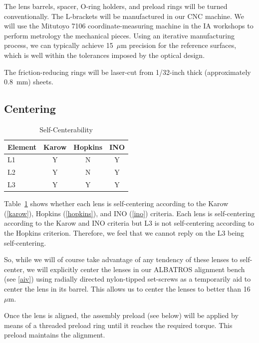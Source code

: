 \documentclass{article}
\newcommand{\micron}{\mbox{$\mu$m}}
\begin{document}
The lens barrels, spacer, O-ring holders, and preload rings will be turned conventionally. The L-brackets will be manufactured in our CNC machine. We will use the Mitutoyo 7106 coordinate-measuring machine in the IA workshops to perform metrology the mechanical pieces. Using an iterative manufacturing process, we can typically achieve 15~{\micron} precision for the reference surfaces, which is well within the tolerances imposed by the optical design.

The friction-reducing rings will be laser-cut from 1/32-inch thick (approximately 0.8~mm) sheets.

\subsection{Centering}

\begin{table}
\caption{Self-Centerability}
\label{table:self-centerability}
\begin{center}
\small
\begin{tabular}{lccc}
\hline
\hline
Element&Karow&Hopkins&INO\\
\hline
L1&Y&N&Y\\
L2&Y&N&Y\\
L3&Y&Y&Y\\
\hline
\end{tabular}
\end{center}
\end{table}

Table~\ref{table:self-centerability} shows whether each lens is self-centering according to the Karow (\ref{karow}), Hopkins (\ref{hopkins}), and INO (\ref{ino}) criteria. Each lens is self-centering according to the Karow and INO criteria but L3 is not self-centering according to the Hopkins criterion. Therefore, we feel that we cannot reply on the L3 being self-centering.

So, while we will of course take advantage of any tendency of these lenses to self-center, we will explicitly center the lenses in our ALBATROS alignment bench (see \ref{aiv}) using radially directed nylon-tipped set-screws as a temporarily aid to center the lens in its barrel. This allows us to center the lenses to better than 16~{\micron}. 

Once the lens is aligned, the assembly preload (see below) will be applied by means of a threaded preload ring until it reaches the required torque. This preload maintains the alignment.
\end{document}
